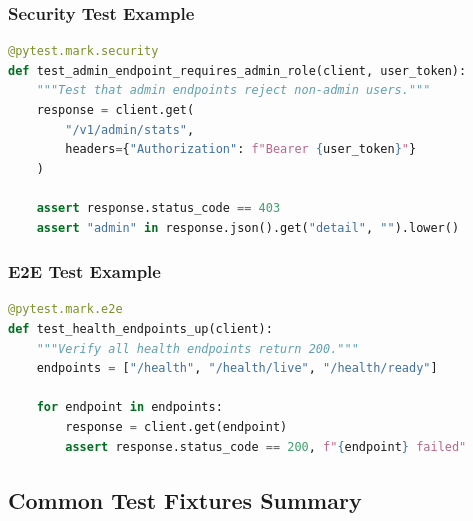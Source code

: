 \subsubsection{Security Test Example}

\begin{lstlisting}[language=Python, caption={Security test for role-based access.}]
@pytest.mark.security
def test_admin_endpoint_requires_admin_role(client, user_token):
    """Test that admin endpoints reject non-admin users."""
    response = client.get(
        "/v1/admin/stats",
        headers={"Authorization": f"Bearer {user_token}"}
    )
    
    assert response.status_code == 403
    assert "admin" in response.json().get("detail", "").lower()
\end{lstlisting}

\subsubsection{E2E Test Example}

\begin{lstlisting}[language=Python, caption={End-to-end health check test.}]
@pytest.mark.e2e
def test_health_endpoints_up(client):
    """Verify all health endpoints return 200."""
    endpoints = ["/health", "/health/live", "/health/ready"]
    
    for endpoint in endpoints:
        response = client.get(endpoint)
        assert response.status_code == 200, f"{endpoint} failed"
\end{lstlisting}

\subsection{Common Test Fixtures Summary}

